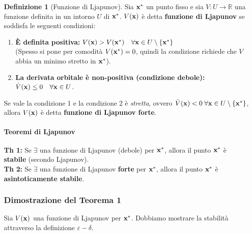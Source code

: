 \documentclass[openany]{book}
\theoremstyle{definition}
\newtheorem*{definizione}{Definizione}
\theoremstyle{remark}
\newcommand{\R}{\mathbb{R}}
\begin{document}
\begin{definizione}[Funzione di Ljapunov]
Sia $\vb{x}^*$ un punto fisso e sia $V: U \to \R$ una funzione definita in un intorno $U$ di $\vb{x}^*$. $V(\vb{x})$ è detta \textbf{funzione di Ljapunov} se soddisfa le seguenti condizioni:
\begin{enumerate}
    \item \textbf{È definita positiva:} $V(\vb{x}) > V(\vb{x}^*) \quad \forall \vb{x} \in U \setminus \{\vb{x}^*\}$ \\
    (Spesso si pone per comodità $V(\vb{x}^*) = 0$, quindi la condizione richiede che $V$ abbia un minimo stretto in $\vb{x}^*$).
    \item \textbf{La derivata orbitale è non-positiva (condizione debole):} $\dot{V}(\vb{x}) \le 0 \quad \forall \vb{x} \in U$.
\end{enumerate}
Se vale la condizione 1 e la condizione 2 è \textit{stretta}, ovvero $\dot{V}(\vb{x}) < 0 \; \forall \vb{x} \in U \setminus \{\vb{x}^*\}$, allora $V(\vb{x})$ è detta \textbf{funzione di Ljapunov forte}.
\end{definizione}

\paragraph{Teoremi di Ljapunov}

\textbf{Th 1:} Se $\exists$ una funzione di Ljapunov (debole) per $\vb{x}^*$, allora il punto $\vb{x}^*$ è \textbf{stabile} (secondo Ljapunov).
\\
\textbf{Th 2:} Se $\exists$ una funzione di Ljapunov \textbf{forte} per $\vb{x}^*$, allora il punto $\vb{x}^*$ è \textbf{asintoticamente stabile}.

\subsubsection*{Dimostrazione del Teorema 1}
Sia $V(\vb{x})$ una funzione di Ljapunov per $\vb{x}^*$. Dobbiamo mostrare la stabilità attraverso la definizione $\varepsilon-\delta$.

\begin{figure}[H]
\centering
{}
\end{figure}
\end{document}
